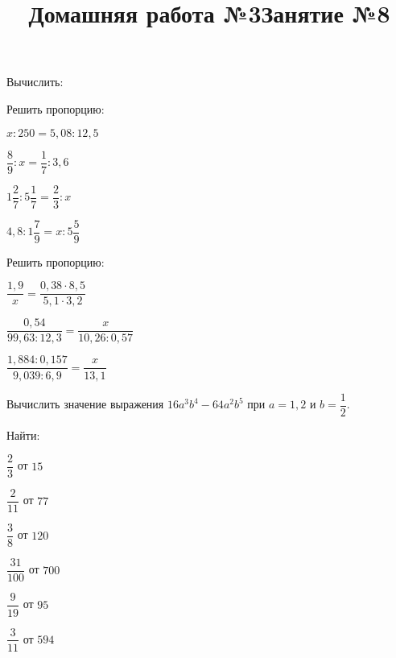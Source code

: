 \newpage
\title{Домашняя работа №3}
\begin{listofex}
	\item Вычислить:
	\begin{enumcols}[itemcolumns=2]
		\item {}
		\item {}
	\end{enumcols}
	\item Решить пропорцию:
	\begin{enumcols}[itemcolumns=3]
		\item \( x:250=5,08:12,5 \)
		\item \( \dfrac{8}{9}:x=\dfrac{1}{7}:3,6 \)
		\item \( 1\dfrac{2}{7}:5\dfrac{1}{7}=\dfrac{2}{3}:x \)
		\item \( 4,8:1\dfrac{7}{9}=x:5\dfrac{5}{9} \)
	\end{enumcols}
	\item Решить пропорцию:
	\begin{enumcols}[itemcolumns=2]
		\item \( \dfrac{1,9}{x}=\dfrac{0,38\cdot8,5}{5,1\cdot3,2} \)
		\item \( \dfrac{0,54}{99,63:12,3}=\dfrac{x}{10,26:0,57} \)
		\item \( \dfrac{1,884:0,157}{9,039:6,9}=\dfrac{x}{13,1} \)
	\end{enumcols}
	\item Вычислить значение выражения \( 16a^3b^4-64a^2b^5 \) при \( a=1,2 \) и \( b=\dfrac{1}{2} \).
	\item Найти:
	\begin{enumcols}[itemcolumns=3]
		\item \( \dfrac{2}{3} \) от \( 15 \)
		\item \( \dfrac{2}{11} \) от \( 77 \)
		\item \( \dfrac{3}{8} \) от \( 120 \)
		\item \( \dfrac{31}{100} \) от \( 700 \)
		\item \( \dfrac{9}{19} \) от \( 95 \)
		\item \( \dfrac{3}{11} \) от \( 594 \)
	\end{enumcols}
\end{listofex}
\newpage
\title{Занятие №8}
